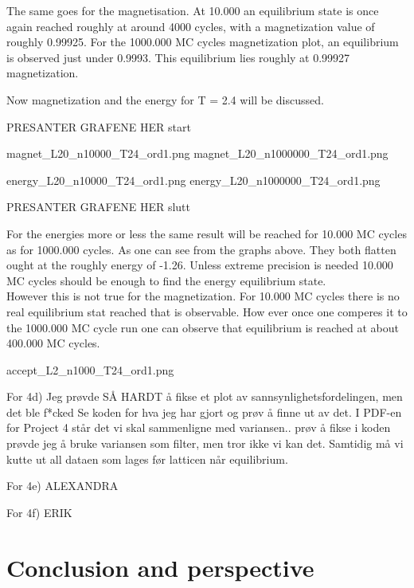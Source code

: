 \documentclass{article}
\begin{document}
The same goes for the magnetisation. At 10.000 an equilibrium state is once again reached roughly at around 4000 cycles, with a magnetization value of roughly 0.99925. For the 1000.000 MC cycles magnetization plot, an equilibrium is observed just under 0.9993. This equilibrium lies roughly at 0.99927 magnetization.

Now magnetization and the energy for T = 2.4 will be discussed.

PRESANTER GRAFENE HER start

magnet\_L20\_n10000\_T24\_ord1.png
magnet\_L20\_n1000000\_T24\_ord1.png

energy\_L20\_n10000\_T24\_ord1.png
energy\_L20\_n1000000\_T24\_ord1.png

PRESANTER GRAFENE HER slutt

For the energies more or less the same result will be reached for 10.000 MC cycles as for 1000.000 cycles. As one can see from the graphs above. They both flatten ought at the roughly energy of -1.26. Unless extreme precision is needed 10.000 MC cycles should be enough to find the energy equilibrium state. \\

However this is not true for the magnetization. For 10.000 MC cycles there is no real equilibrium stat reached that is observable. How ever once one comperes it to the 1000.000 MC cycle run one can observe that equilibrium is reached at about 400.000 MC cycles.


accept\_L2\_n1000\_T24\_ord1.png







For 4d) Jeg prøvde SÅ HARDT å fikse et plot av sannsynlighetsfordelingen, men det ble f*cked
Se koden for hva jeg har gjort og prøv å finne ut av det.
I PDF-en for Project 4 står det vi skal sammenligne med variansen.. prøv å fikse
i koden prøvde jeg å bruke variansen som filter, men tror ikke vi kan det. Samtidig må vi kutte ut all dataen som lages før latticen når equilibrium.

For 4e) ALEXANDRA

For 4f) ERIK


\vspace{1cm}

\section{Conclusion and perspective} \label{sec:Conclusion}
\end{document}
